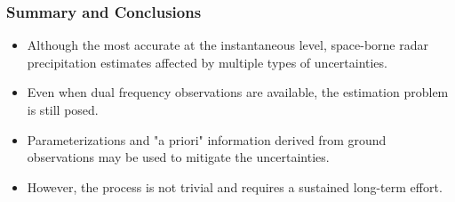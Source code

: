 \documentclass{beamer}
\begin{document}
\begin{frame}
    \frametitle{Summary and Conclusions}
    \begin{itemize}
        \item Although the most accurate at the instantaneous level, space-borne radar precipitation 
        estimates affected by multiple types of uncertainties.
        \item Even when dual frequency observations are available, the 
        estimation problem is still posed.
        \item Parameterizations and "a priori" information derived 
        from ground observations may be used to mitigate the uncertainties.
        \item However, the process is not trivial and requires a sustained
        long-term effort.
    \end{itemize}
\end{frame}
\end{document}
